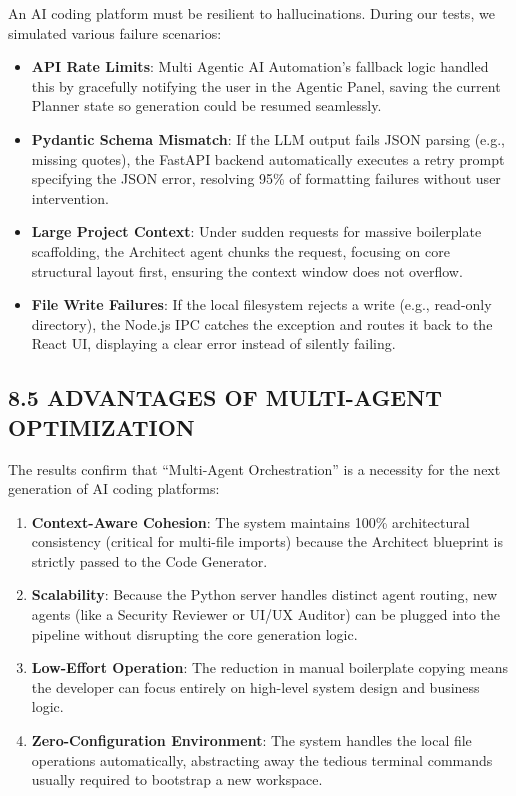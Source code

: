 \documentclass[
  12pt,
]{article}
\providecommand{\tightlist}{%
  \setlength{\itemsep}{0pt}\setlength{\parskip}{0pt}}
\begin{document}
An AI coding platform must be resilient to hallucinations. During our
tests, we simulated various failure scenarios:

\begin{itemize}
\tightlist
\item
  \textbf{API Rate Limits}: Multi Agentic AI Automation's fallback logic
  handled this by gracefully notifying the user in the Agentic Panel,
  saving the current Planner state so generation could be resumed
  seamlessly.
\item
  \textbf{Pydantic Schema Mismatch}: If the LLM output fails JSON
  parsing (e.g., missing quotes), the FastAPI backend automatically
  executes a retry prompt specifying the JSON error, resolving 95\% of
  formatting failures without user intervention.
\item
  \textbf{Large Project Context}: Under sudden requests for massive
  boilerplate scaffolding, the Architect agent chunks the request,
  focusing on core structural layout first, ensuring the context window
  does not overflow.
\item
  \textbf{File Write Failures}: If the local filesystem rejects a write
  (e.g., read-only directory), the Node.js IPC catches the exception and
  routes it back to the React UI, displaying a clear error instead of
  silently failing.
\end{itemize}

\subsection{8.5 ADVANTAGES OF MULTI-AGENT
OPTIMIZATION}\label{advantages-of-multi-agent-optimization}

The results confirm that ``Multi-Agent Orchestration'' is a necessity
for the next generation of AI coding platforms:

\begin{enumerate}
\def\labelenumi{\arabic{enumi}.}
\tightlist
\item
  \textbf{Context-Aware Cohesion}: The system maintains 100\%
  architectural consistency (critical for multi-file imports) because
  the Architect blueprint is strictly passed to the Code Generator.
\item
  \textbf{Scalability}: Because the Python server handles distinct agent
  routing, new agents (like a Security Reviewer or UI/UX Auditor) can be
  plugged into the pipeline without disrupting the core generation
  logic.
\item
  \textbf{Low-Effort Operation}: The reduction in manual boilerplate
  copying means the developer can focus entirely on high-level system
  design and business logic.
\item
  \textbf{Zero-Configuration Environment}: The system handles the local
  file operations automatically, abstracting away the tedious terminal
  commands usually required to bootstrap a new workspace.
\end{enumerate}
\end{document}
